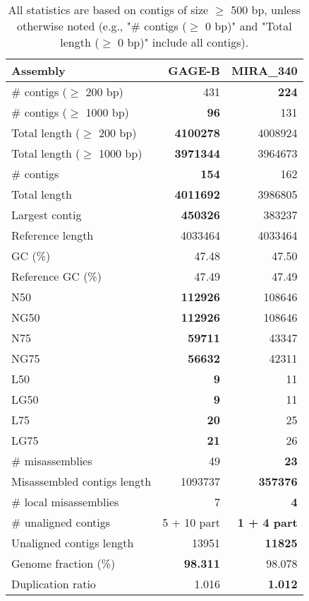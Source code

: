 \documentclass[12pt,a4paper]{article}
\begin{document}
\begin{table}[ht]
\begin{center}
\caption{All statistics are based on contigs of size $\geq$ 500 bp, unless otherwise noted (e.g., "\# contigs ($\geq$ 0 bp)" and "Total length ($\geq$ 0 bp)" include all contigs).}
\begin{tabular}{|l*{2}{|r}|}
\hline
Assembly & GAGE-B & MIRA\_340 \\ \hline
\# contigs ($\geq$ 200 bp) & 431 & {\bf 224} \\ \hline
\# contigs ($\geq$ 1000 bp) & {\bf 96} & 131 \\ \hline
Total length ($\geq$ 200 bp) & {\bf 4100278} & 4008924 \\ \hline
Total length ($\geq$ 1000 bp) & {\bf 3971344} & 3964673 \\ \hline
\# contigs & {\bf 154} & 162 \\ \hline
Total length & {\bf 4011692} & 3986805 \\ \hline
Largest contig & {\bf 450326} & 383237 \\ \hline
Reference length & 4033464 & 4033464 \\ \hline
GC (\%) & 47.48 & 47.50 \\ \hline
Reference GC (\%) & 47.49 & 47.49 \\ \hline
N50 & {\bf 112926} & 108646 \\ \hline
NG50 & {\bf 112926} & 108646 \\ \hline
N75 & {\bf 59711} & 43347 \\ \hline
NG75 & {\bf 56632} & 42311 \\ \hline
L50 & {\bf 9} & 11 \\ \hline
LG50 & {\bf 9} & 11 \\ \hline
L75 & {\bf 20} & 25 \\ \hline
LG75 & {\bf 21} & 26 \\ \hline
\# misassemblies & 49 & {\bf 23} \\ \hline
Misassembled contigs length & 1093737 & {\bf 357376} \\ \hline
\# local misassemblies & 7 & {\bf 4} \\ \hline
\# unaligned contigs & 5 + 10 part & {\bf 1 + 4 part} \\ \hline
Unaligned contigs length & 13951 & {\bf 11825} \\ \hline
Genome fraction (\%) & {\bf 98.311} & 98.078 \\ \hline
Duplication ratio & 1.016 & {\bf 1.012} \\ \hline

\end{tabular}
\end{center}
\end{table}
\end{document}
